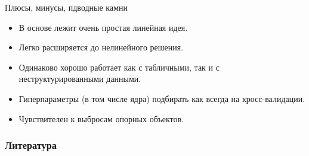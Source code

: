 \documentclass[9pt]{beamer}
\begin{document}
\begin{frame}{Плюсы, минусы, пдводные камни}
\begin{itemize}
    \item В основе лежит очень простая линейная идея.
    \item Легко расширяется до нелинейного решения.
    \item Одинаково хорошо работает как с табличными, так и с неструктурированными данными.
    \item Гиперпараметры (в том числе ядра) подбирать как всегда на кросс-валидации.
    \item Чувствителен к выбросам опорных объектов.
\end{itemize}
\end{frame}

\begin{frame}[allowframebreaks]
    \frametitle{Литература}
    
    \nocite{esl}
    \nocite{vokov}
    
\end{frame}
\end{document}
